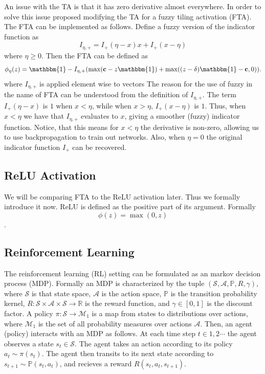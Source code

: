 \documentclass{article}
\newcommand{\RR}{\mathbb{R}}
\newcommand{\PP}{\mathbb{P}}
\newcommand{\cS}{\mathcal{S}}
\newcommand{\cA}{\mathcal{A}}
\newcommand{\cM}{\mathcal{M}}
\begin{document}
An issue with the TA is that it has zero derivative almost everywhere.
In order to solve this issue \cite{pan2019fuzzy} proposed modifying the TA for a fuzzy tiling activation (FTA).
The FTA can be implemented as follows.
Define a fuzzy version of the indicator function as
$$I_{\eta, +} = I_+(\eta -x)x + I_+(x - \eta)$$
where $\eta \ge 0$.
Then the FTA can be defined as
$$\phi_\eta(z) = \mathbbm{1} - I_{\eta, +} (\max(\mathbf{c} - z \mathbbm{1}) + \max((z-\delta)\mathbbm{1} - \mathbf{c}, 0)).$$
where $I_{\eta, +}$ is applied element wise to vectors
The reason for the use of fuzzy in the name of FTA can be understood from the definition of $I_{\eta, +}$.
The term $I_+(\eta -x)$ is $1$ when $x < \eta$, while when $x > \eta$, $I_+(x - \eta)$ is $1$.
Thus, when $x < \eta$ we have that $I_{\eta ,+}$ evaluates to $x$, giving a smoother (fuzzy) indicator function.
Notice, that this means for $x < \eta$ the derivative is non-zero, allowing us to use backpropagation to train out networks.
Also, when $\eta = 0$ the original indicator function $I_+$ can be recovered.

\subsection{ReLU Activation}
We will be comparing FTA to the ReLU activation later.
Thus we formally introduce it now.
ReLU is defined as the positive part of its argument. Formally
$$\phi(z) = \max(0, z)$$.

\subsection{Reinforcement Learning} \label{sub-sec:reinforcement}
The reinforcement learning (RL) setting can be formulated as an markov decision process (MDP).
Formally an MDP is characterized by the tuple $(\cS, \cA, \PP, R, \gamma)$, where $\cS$ is that state space, $\cA$ is the action space,
$\PP$ is the transition probability kernel, $R: \cS \times \cA \times \cS \to \RR$ is the reward function, and $\gamma \in [0, 1]$ is the discount factor.
A policy $\pi: \cS \to \cM_1$ is a map from states to distributions over actions, where $\cM_1$ is the set of all probability measures over actions $\cA$.
Then, an agent (policy) interacts with an MDP as follows.
At each time step $t \in 1, 2 \cdots$ the agent observes a state $s_t \in \cS$.
The agent takes an action according to its policy $a_t \sim \pi(s_t)$.
The agent then transits to its next state according to $s_{t+1} \sim \PP(s_t, a_t)$, and recieves a reward $R(s_t, a_t, s_{t+1})$.
\end{document}
